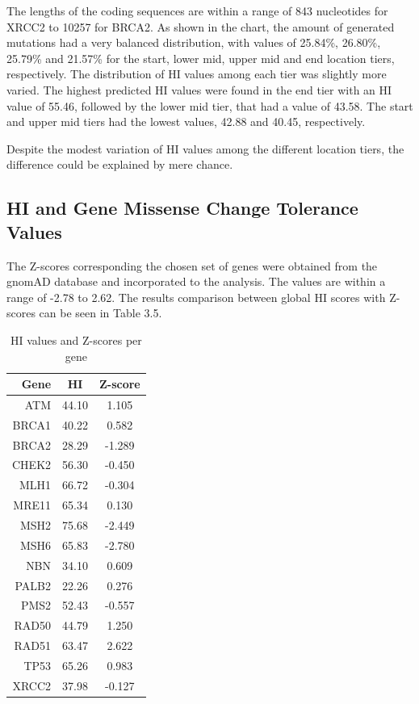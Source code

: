 \documentclass[12pt,MSc,wordcount,anon]{muthesis}
\begin{document}
\begin{flushleft}
The lengths of the coding sequences are within a range of 843 nucleotides for XRCC2 to 10257 for BRCA2. As shown in the chart, the amount of generated mutations had a very balanced distribution, with values of 25.84\%, 26.80\%, 25.79\% and 21.57\% for the start, lower mid, upper mid and end location tiers, respectively. The distribution of HI values among each tier was slightly more varied. The highest predicted HI values were found in the end tier with an HI value of 55.46, followed by the lower mid tier, that had a value of 43.58. The start and upper mid tiers had the lowest values, 42.88 and 40.45, respectively.

Despite the modest variation of HI values among the different location tiers, the difference could be explained by mere chance.

\subsection{HI and Gene Missense Change Tolerance Values}

The Z-scores corresponding the chosen set of genes were obtained from the gnomAD database and incorporated to the analysis. The values are within a range of -2.78 to 2.62. The results comparison between global HI scores with Z-scores can be seen in Table 3.5.

\begin{table}
\begin{center}
\begin{tabular}{|r|c|c|}\hline\hline
Gene&HI&Z-score\\\hline
ATM&44.10&1.105\\
BRCA1&40.22&0.582\\
BRCA2&28.29&-1.289\\
CHEK2&56.30&-0.450\\
MLH1&66.72&-0.304\\
MRE11&65.34&0.130\\
MSH2&75.68&-2.449\\
MSH6&65.83&-2.780\\
NBN&34.10&0.609\\
PALB2&22.26&0.276\\
PMS2&52.43&-0.557\\
RAD50&44.79&1.250\\
RAD51&63.47&2.622\\
TP53&65.26&0.983\\
XRCC2&37.98&-0.127\\\hline\hline
\end{tabular}
\end{center}
\caption{HI values and Z-scores per gene}\label{wombat}
\end{table}


\end{flushleft}
\end{document}
